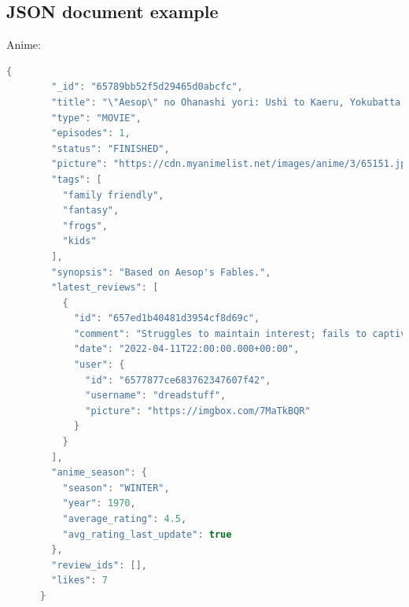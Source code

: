 \newpage

\subsection*{JSON document example}
Anime:
\begin{mdframed}[backgroundcolor=yellow!20, innerleftmargin=10pt, innerrightmargin=10pt]
    \begin{lstlisting}[language=java]
      {
        "_id": "65789bb52f5d29465d0abcfc",
        "title": "\"Aesop\" no Ohanashi yori: Ushi to Kaeru, Yokubatta Inu",
        "type": "MOVIE",
        "episodes": 1,
        "status": "FINISHED",
        "picture": "https://cdn.myanimelist.net/images/anime/3/65151.jpg",
        "tags": [
          "family friendly",
          "fantasy",
          "frogs",
          "kids"
        ],
        "synopsis": "Based on Aesop's Fables.",
        "latest_reviews": [
          {
            "id": "657ed1b40481d3954cf8d69c",
            "comment": "Struggles to maintain interest; fails to captivate.",
            "date": "2022-04-11T22:00:00.000+00:00",
            "user": {
              "id": "6577877ce683762347607f42",
              "username": "dreadstuff",
              "picture": "https://imgbox.com/7MaTkBQR"
            }
          }
        ],
        "anime_season": {
          "season": "WINTER",
          "year": 1970,
          "average_rating": 4.5,
          "avg_rating_last_update": true
        },
        "review_ids": [],
        "likes": 7
      }
      
    \end{lstlisting}
\end{mdframed}

